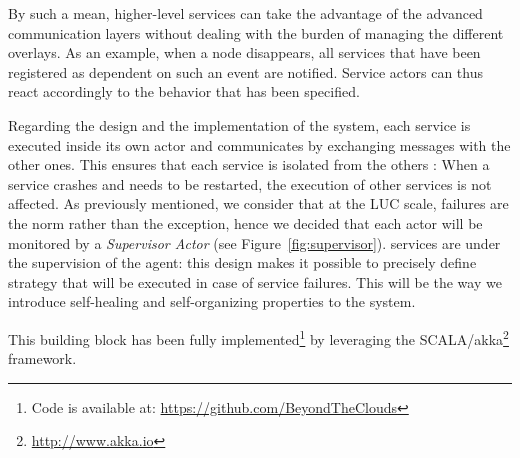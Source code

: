 By such a mean, higher-level services can take the advantage of the advanced
communication layers without dealing with the burden of managing the different
overlays. As an example, when a node disappears, all services that
have been registered as dependent on such an event are notified. 
Service actors can thus react accordingly to the behavior that has been specified. 
%
%
%
%

Regarding the design and the implementation of the \discovery system, each
service is executed inside its own actor and communicates by
exchanging messages with the other ones. This ensures that each
service is isolated from the others : When a service crashes and needs to be
restarted, the execution of other services is not affected. 
%
As previously mentioned, we consider that at the LUC scale, failures are the norm
rather than the exception, hence we decided that each actor will be monitored
by a \emph{Supervisor Actor} (see Figure~\ref{fig:supervisor}). \discovery services are under the supervision of the \discovery agent: this design makes it possible to precisely define strategy
that will be executed in case of service failures. This will be the way we
introduce self-healing and self-organizing properties to the \discovery system.

This building block has been fully implemented\footnote{Code is available at:
\href{https://github.com/BeyondTheClouds}{\url{https://github.com/BeyondTheClouds}}} by 
leveraging the SCALA/akka\footnote{\href{http://www.akka.io}{\url{http://www.akka.io}}} framework.

